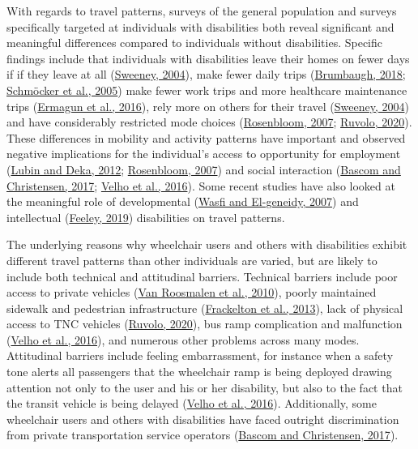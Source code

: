 \documentclass[3p, authoryear, review]{elsarticle} %
\begin{document}
With regards to travel patterns, surveys of the general population and surveys
specifically targeted at individuals with disabilities both reveal significant and
meaningful differences compared to individuals without disabilities. Specific
findings include that individuals with disabilities leave their homes on fewer
days if if they leave at all (\protect\hyperlink{ref-Sweeney2004}{Sweeney, 2004}), make fewer daily trips (\protect\hyperlink{ref-Brumbaugh2018}{Brumbaugh, 2018}; \protect\hyperlink{ref-Schmocker2005}{Schmöcker et al., 2005}) make fewer work trips and more healthcare maintenance trips
(\protect\hyperlink{ref-Ermagun2016}{Ermagun et al., 2016}), rely more on others for their travel (\protect\hyperlink{ref-Sweeney2004}{Sweeney, 2004})
and have considerably restricted mode choices (\protect\hyperlink{ref-Rosenbloom2007}{Rosenbloom, 2007}; \protect\hyperlink{ref-Ruvolo2020}{Ruvolo, 2020}).
These differences in mobility and activity patterns have important and observed
negative implications for the individual's access to opportunity for employment
(\protect\hyperlink{ref-Lubin2012}{Lubin and Deka, 2012}; \protect\hyperlink{ref-Rosenbloom2007}{Rosenbloom, 2007}) and social interaction (\protect\hyperlink{ref-Bascom2017}{Bascom and Christensen, 2017}; \protect\hyperlink{ref-Velho2016}{Velho et al., 2016}).
Some recent studies have also looked at the meaningful role of developmental (\protect\hyperlink{ref-Wasfi2007}{Wasfi and El-geneidy, 2007})
and intellectual (\protect\hyperlink{ref-Feeley2019}{Feeley, 2019}) disabilities on travel patterns.

The underlying reasons why wheelchair users and others with disabilities exhibit
different travel patterns than other individuals are varied, but are
likely to include both technical and attitudinal barriers. Technical barriers
include poor access to private vehicles
(\protect\hyperlink{ref-VanRoosmalen2010}{Van Roosmalen et al., 2010}), poorly maintained sidewalk and pedestrian infrastructure
(\protect\hyperlink{ref-frackelton2013measuring}{Frackelton et al., 2013}), lack of physical access to TNC
vehicles (\protect\hyperlink{ref-Ruvolo2020}{Ruvolo, 2020}), bus ramp complication and malfunction (\protect\hyperlink{ref-Velho2016}{Velho et al., 2016}),
and numerous other problems across many modes.
Attitudinal barriers include feeling embarrassment, for instance when a safety
tone alerts all passengers that the wheelchair ramp is being deployed drawing
attention not only to the user and his or her disability, but also to the fact that the
transit vehicle is being delayed (\protect\hyperlink{ref-Velho2016}{Velho et al., 2016}). Additionally, some wheelchair users
and others with disabilities have faced outright discrimination from private
transportation service operators (\protect\hyperlink{ref-Bascom2017}{Bascom and Christensen, 2017}).
\end{document}
